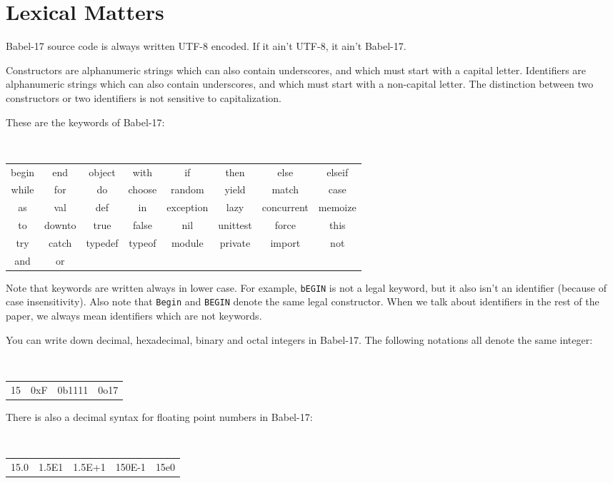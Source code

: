\documentclass[11pt]{amsart}
\begin{document}
\section{Lexical Matters}
Babel-17 source code is always written UTF-8 encoded. If it ain't UTF-8, it ain't Babel-17. 

Constructors are alphanumeric strings which can also contain underscores, and which must start with a capital letter. 
Identifiers are alphanumeric strings which can also contain underscores, and which must start with a non-capital letter.
The distinction between two constructors or two identifiers is not sensitive to capitalization.

These are the keywords of Babel-17:
\begin{center}
\tt
\begin{tabular}{cccccccc}
begin & end & object & with & if & then & else & elseif \\
while &  for & do & choose & random & yield & match & case \\
as & val & def & in & exception & lazy & concurrent & memoize \\
to & downto & true & false & nil & unittest &  force & this \\
try & catch &  typedef &  typeof &  module &  private &  import & not  \\
and & or &  &  &  &   &  & 
\end{tabular}
\end{center}
Note that keywords are written always in lower case. For example, {\tt bEGIN} is not a legal keyword, but it also isn't an identifier (because of case insensitivity). Also note that {\tt Begin} and {\tt BEGIN} denote the same legal constructor. When we talk about identifiers in the rest of the paper, we always mean identifiers which are not keywords.

You can write down decimal, hexadecimal, binary and octal integers in Babel-17. The following notations all denote the same integer:
\begin{center}
\tt
\begin{tabular}{cccc}
15 & 0xF & 0b1111 &  0o17
\end{tabular}
\end{center}

There is also a decimal syntax for floating point numbers in Babel-17:
\begin{center}
\tt
\begin{tabular}{ccccc}
15.0 & 1.5E1 & 1.5E+1 &  150E-1 & 15e0
\end{tabular}
\end{center}
\end{document}
